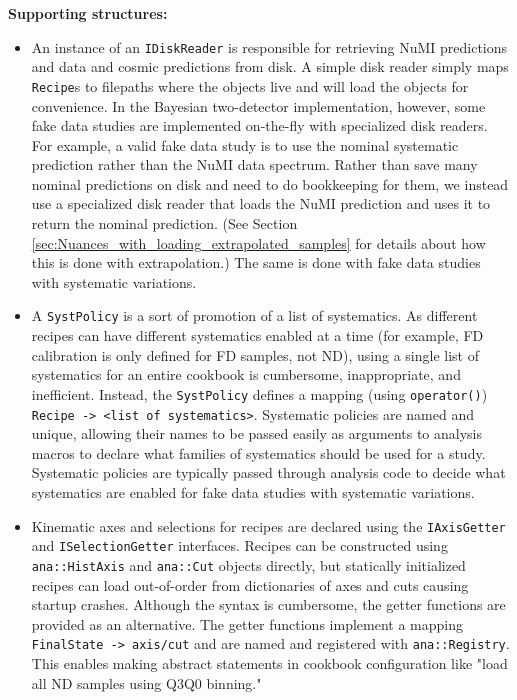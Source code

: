 \documentclass{article}
\begin{document}
\textbf{Supporting structures:}
\begin{itemize}
    \item An instance of an \texttt{IDiskReader} is responsible for retrieving NuMI predictions and data and cosmic predictions from disk. A simple disk reader simply maps \texttt{Recipe}s to filepaths where the objects live and will load the objects for convenience. In the Bayesian two-detector implementation, however, some fake data studies are implemented on-the-fly with specialized disk readers. For example, a valid fake data study is to use the nominal systematic prediction rather than the NuMI data spectrum. Rather than save many nominal predictions on disk and need to do bookkeeping for them, we instead use a specialized disk reader that loads the NuMI prediction and uses it to return the nominal prediction. (See Section \ref{sec:Nuances_with_loading_extrapolated_samples} for details about how this is done with extrapolation.) The same is done with fake data studies with systematic variations.
    \item A \texttt{SystPolicy} is a sort of promotion of a list of systematics. As different recipes can have different systematics enabled at a time (for example, FD calibration is only defined for FD samples, not ND), using a single list of systematics for an entire cookbook is cumbersome, inappropriate, and inefficient. Instead, the \texttt{SystPolicy} defines a mapping (using \texttt{operator()}) \texttt{Recipe -> <list of systematics>}. Systematic policies are named and unique, allowing their names to be passed easily as arguments to analysis macros to declare what families of systematics should be used for a study. Systematic policies are typically passed through analysis code to decide what systematics are enabled for fake data studies with systematic variations.
    \item Kinematic axes and selections for recipes are declared using the \texttt{IAxisGetter} and \texttt{ISelectionGetter} interfaces. Recipes can be constructed using \texttt{ana::HistAxis} and \texttt{ana::Cut} objects directly, but statically initialized recipes can load out-of-order from dictionaries of axes and cuts causing startup crashes. Although the syntax is cumbersome, the getter functions are provided as an alternative. The getter functions implement a mapping \texttt{FinalState -> axis/cut} and are named and registered with \texttt{ana::Registry}. This enables making abstract statements in cookbook configuration like "load all ND samples using Q3Q0 binning."
\end{itemize}
\end{document}
